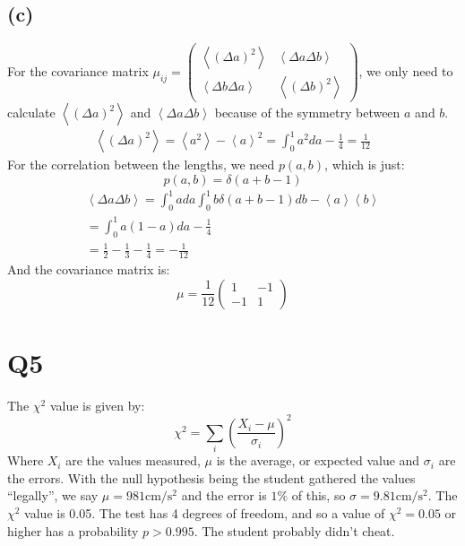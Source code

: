 \documentclass[12pt]{article}
\begin{document}
\subsection*{(c)}
For the covariance matrix $\mu_{ij} = \left(\begin{matrix}\left<(\Delta a)^2\right> & \left<\Delta a\Delta b\right> \\ \left<\Delta b\Delta a\right> & \left<(\Delta b)^2\right>\end{matrix}\right)$, we only need to calculate $\left<(\Delta a)^2\right>$ and $\left<\Delta a\Delta b\right>$ because of the symmetry between $a$ and $b$. 
\begin{align*}
	\left<(\Delta a)^2\right> = \left<a^2\right> - \left<a\right>^2 = \int_0^1a^2da - \frac{1}{4} = \frac{1}{12}
\end{align*}
For the correlation between the lengths, we need $p(a, b)$, which is just:
\begin{equation}
	p(a, b) = \delta(a+b-1)
\end{equation}
\begin{align*}
	\left<\Delta a\Delta b\right> = \int_0^1ada\int_0^1b\delta(a+b-1)db - \left<a\right>\left<b\right> \\
	= \int_0^1a (1-a)da - \frac{1}{4} \\
	= \frac{1}{2}-\frac{1}{3}-\frac{1}{4} = -\frac{1}{12}
\end{align*}
And the covariance matrix is:
\begin{equation}
	\mu = \frac{1}{12}\left(\begin{matrix}1 & -1 \\ -1 & 1\end{matrix}\right)
\end{equation}
\section*{Q5}
The $\chi^2$ value is given by:
\begin{equation}
	\chi^2 = \sum_i \left(\frac{X_i-\mu}{\sigma_i}\right)^2
\end{equation}
Where $X_i$ are the values measured, $\mu$ is the average, or expected value and $\sigma_i$ are the errors.
With the null hypothesis being the student gathered the values ``legally'', we say $\mu=981\text{cm/s$^2$}$ and the error is $1\%$ of this, so $\sigma=9.81\text{cm/s$^2$}$. The $\chi^2$ value is 0.05. The test has 4 degrees of freedom, and so a value of $\chi^2=0.05$ or higher has a probability $p>0.995$. The student probably didn't cheat.
\end{document}
